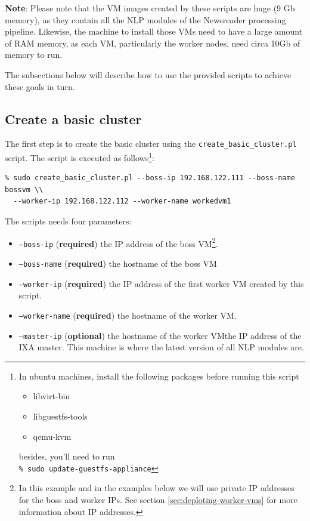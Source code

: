 \documentclass[a4]{article}
\begin{document}
\noindent \textbf{Note}: Please note that the VM images created by these
scripts are huge (9 Gb memory), as they contain all the NLP modules of the
Newsreader processing pipeline. Likewise, the machine to install those VMs
need to have a large amount of RAM memory, as each VM, particularly the
worker nodes, need circa 10Gb of memory to run.

The subsections below will describe how to use the provided scripts to
achieve these goals in turn.

\subsection{Create a basic cluster}
\label{sec:create-basic-cluster}

The first step is to create the basic cluster using the
\texttt{create\_basic\_cluster.pl} script. The script is executed as
follows\footnote{In ubuntu machines, install the following packages before
  running this script
  \begin{itemize}
  \item libvirt-bin
  \item libguestfs-tools
  \item qemu-kvm
  \end{itemize}
\noindent besides, you'll need to run\\
\texttt{\% sudo update-guestfs-appliance}
}:

\begin{verbatim}
% sudo create_basic_cluster.pl --boss-ip 192.168.122.111 --boss-name bossvm \\
  --worker-ip 192.168.122.112 --worker-name workedvm1
\end{verbatim}

\noindent The scripts needs four parameters:
\begin{itemize}
\item \texttt{--boss-ip} (\textbf{required}) the IP address of the boss
  VM\footnote{In this example and in the examples below we will use private
    IP addresses for the boss and worker IPs. See section
    \ref{sec:deploting-worker-vms} for more information about IP
    addresses.}.
\item \texttt{--boss-name} (\textbf{required}) the hostname of the boss VM
\item \texttt{--worker-ip} (\textbf{required}) the IP address of the first
  worker VM created by this script.
\item \texttt{--worker-name} (\textbf{required}) the hostname of the worker
  VM.
\item \texttt{--master-ip} (\textbf{optional}) the hostname of the worker
  VMthe IP address of the IXA master. This machine is where the latest
  version of all NLP modules are.
\end{itemize}
\end{document}
